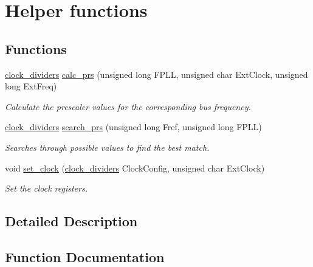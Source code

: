 \hypertarget{group__helper}{}\section{Helper functions}
\label{group__helper}
\subsection*{Functions}
\begin{DoxyCompactItemize}
\item 
\hyperlink{structclock__dividers}{clock\+\_\+dividers} \hyperlink{group__helper_gab1ca661150fc5676794ddf0cca50ce8d}{calc\+\_\+prs} (unsigned long F\+P\+L\+L, unsigned char Ext\+Clock, unsigned long Ext\+Freq)
\begin{DoxyCompactList}\small\item\em Calculate the prescaler values for the corresponding bus frequency. \end{DoxyCompactList}\item 
\hyperlink{structclock__dividers}{clock\+\_\+dividers} \hyperlink{group__helper_gadfb20c94648c619f69d32ed3920faed0}{search\+\_\+prs} (unsigned long Fref, unsigned long F\+P\+L\+L)
\begin{DoxyCompactList}\small\item\em Searches through possible values to find the best match. \end{DoxyCompactList}\item 
void \hyperlink{group__helper_ga97250687e8ce6c1f1c893c93766afe1c}{set\+\_\+clock} (\hyperlink{structclock__dividers}{clock\+\_\+dividers} Clock\+Config, unsigned char Ext\+Clock)
\begin{DoxyCompactList}\small\item\em Set the clock registers. \end{DoxyCompactList}\end{DoxyCompactItemize}


\subsection{Detailed Description}


\subsection{Function Documentation}
\hypertarget{group__helper_gab1ca661150fc5676794ddf0cca50ce8d}{}
